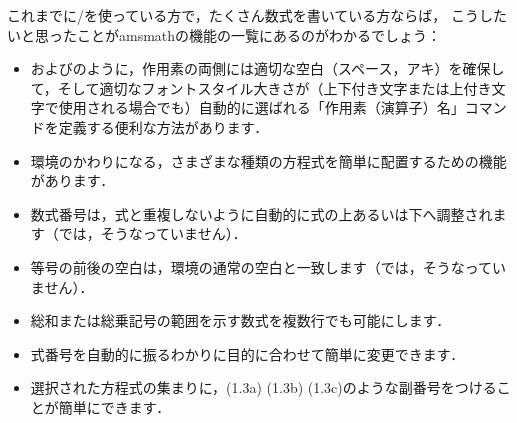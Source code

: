 \documentclass[leqno,titlepage,openany]{amsldoc}[1999/12/13]
\makeatletter
\newcommand{\nipkg}{\textsf}
\let\oldcs\cs
\def\cs#1{\texorpdfstring{\oldcs{#1}}{\@backslashchar\@backslashchar#1}}
\let\cn\cs
\makeatother
\begin{document}
これまでに\latex/を使っている方で，たくさん数式を書いている方ならば，
こうしたいと思ったことが\nipkg{amsmath}の機能の一覧にあるのがわかるでしょう：
\begin{itemize}

\item \cn{sin}および\cn{lim}のように，作用素の両側には適切な空白（スペース，アキ）を確保して，そして適切なフォントスタイル大きさが（上下付き文字または上付き文字で使用される場合でも）自動的に選ばれる「作用素（演算子）名」コマンドを定義する便利な方法があります．

\item {}環境のかわりになる，さまざまな種類の方程式を簡単に配置するための機能があります．

\item 数式番号は，式と重複しないように自動的に式の上あるいは下へ調整されます（では，そうなっていません）．

\item 等号の前後の空白は，環境の通常の空白と一致します（では，そうなっていません）．

\item 総和または総乗記号の範囲を示す数式を複数行でも可能にします．

\item 式番号を自動的に振るわかりに目的に合わせて簡単に変更できます．

\item 選択された方程式の集まりに，(1.3a) (1.3b) (1.3c)のような副番号をつけることが簡単にできます．

\end{itemize}
\end{document}
